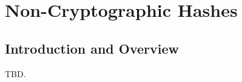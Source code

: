 \chapter{Non-Cryptographic Hashes}
\label{cnch0}

\section{Introduction and Overview}
\label{cnch0:siov0}

TBD.

